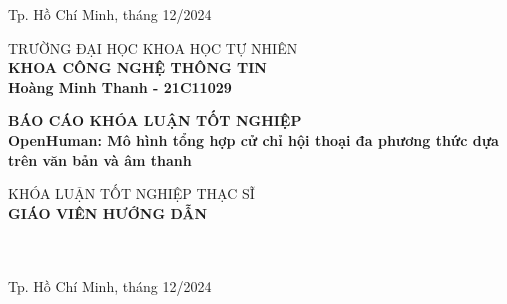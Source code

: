 \begin{titlepage}
\begin{center}

\vfill
Tp. Hồ Chí Minh, tháng 12/2024

\end{center}

\pagebreak



\begin{center}

TRƯỜNG ĐẠI HỌC KHOA HỌC TỰ NHIÊN\\
\textbf{KHOA CÔNG NGHỆ THÔNG TIN}\\[2cm]


{\large \bfseries Hoàng Minh Thanh - 21C11029\\[2cm]}


{ \Large \bfseries  BÁO CÁO KHÓA LUẬN TỐT NGHIỆP \\ 
	OpenHuman: Mô hình tổng hợp cử chỉ hội thoại đa phương
	thức dựa trên văn bản và âm thanh
	\\[2cm] } 


\large KHÓA LUẬN TỐT NGHIỆP THẠC SĨ \\


\textbf{GIÁO VIÊN HƯỚNG DẪN}\\
\tenGVHD\\
\tenBM\\


\vfill
Tp. Hồ Chí Minh, tháng 12/2024

\end{center}

\end{titlepage}